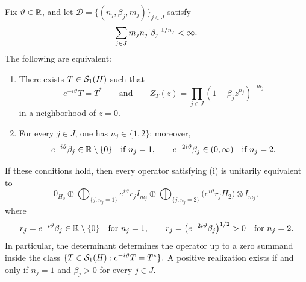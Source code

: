 \begin{theorem}
  \label{thm:line-rigidity-trace}
  Fix \(\vartheta\in\mathbb{R}\), and let
  \(
    \mathcal D=\{(n_j,\beta_j,m_j)\}_{j\in J}
  \)
  satisfy
  \[
    \sum_{j\in J}m_jn_j\lvert \beta_j \rvert^{1/n_j}<\infty.
  \]
  The following are equivalent:
  \begin{enumerate}[label=\textup{(\roman*)}]
    \item There exists \(T\in \mathcal S_1(H)\) such that
      \[
        e^{-i\vartheta}T=T^*
        \qquad\text{and}\qquad
        Z_T(z)=\prod_{j\in J}(1-\beta_j z^{n_j})^{-m_j}
      \]
      in a neighborhood of \(z=0\).
    \item For every \(j\in J\), one has \(n_j\in\{1,2\}\); moreover,
      \[
        e^{-i\vartheta}\beta_j\in \mathbb{R}\setminus\{0\}
        \quad\text{if } n_j=1,
        \qquad
        e^{-2i\vartheta}\beta_j\in (0,\infty)
        \quad\text{if } n_j=2.
      \]
  \end{enumerate}
  If these conditions hold, then every operator satisfying
  \textup{(i)} is unitarily equivalent to
  \[
    0_{H_0}\oplus
    \bigoplus_{\{j:n_j=1\}}
      e^{i\vartheta}r_j I_{m_j}
    \oplus
    \bigoplus_{\{j:n_j=2\}}
      \bigl(e^{i\vartheta}r_j\Pi_2\bigr)\otimes I_{m_j},
  \]
  where
  \[
    r_j=e^{-i\vartheta}\beta_j\in \mathbb{R}\setminus\{0\}
    \quad\text{for } n_j=1,
    \qquad
    r_j=\bigl(e^{-2i\vartheta}\beta_j\bigr)^{1/2}>0
    \quad\text{for } n_j=2.
  \]
  In particular, the determinant determines the operator up to a zero
  summand inside the class
  \(
    \{T\in \mathcal S_1(H):e^{-i\vartheta}T=T^*\}.
  \)
  A positive realization exists if and only if \(n_j=1\) and
  \(\beta_j>0\) for every \(j\in J\).
\end{theorem}

